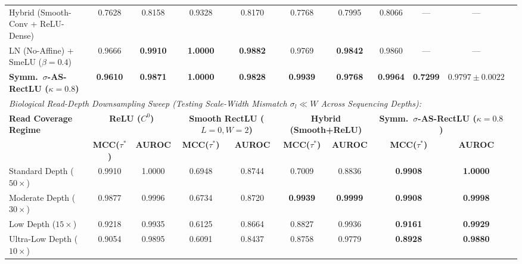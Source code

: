 \begin{table}[t]
\begin{tabular}{lcccccccccc}
Hybrid (Smooth-Conv + ReLU-Dense) & 0.7628 & 0.8158 & 0.9328 & 0.8170 & 0.7768 & 0.7995 & 0.8066 & --- & --- \\
LN (No-Affine) + SmeLU ($\beta=0.4$) & 0.9666 & \textbf{0.9910} & \textbf{1.0000} & \textbf{0.9882} & 0.9769 & \textbf{0.9842} & 0.9860 & --- & --- \\
\textbf{Symm.\ $\sigma$-AS-RectLU ($\kappa=0.8$)} & \textbf{0.9610} & \textbf{0.9871} & \textbf{1.0000} & \textbf{0.9828} & \textbf{0.9939} & \textbf{0.9768} & \textbf{0.9964} & \textbf{0.7299} & $\mathbf{0.9797 \pm 0.0022}$ \\
\midrule
\multicolumn{10}{l}{\textit{Biological Read-Depth Downsampling Sweep (Testing Scale-Width Mismatch $\sigma_l \ll W$ Across Sequencing Depths):}} \\
\midrule
\textbf{Read Coverage Regime} & \multicolumn{2}{c}{\textbf{ReLU ($C^0$)}} & \multicolumn{2}{c}{\textbf{Smooth RectLU ($L=0, W=2$)}} & \multicolumn{2}{c}{\textbf{Hybrid (Smooth+ReLU)}} & \multicolumn{3}{c}{\textbf{Symm.\ $\sigma$-AS-RectLU ($\kappa=0.8$)}} \\
\cmidrule(lr){2-3} \cmidrule(lr){4-5} \cmidrule(lr){6-7} \cmidrule(lr){8-10}
& \textbf{MCC($\tau^*$)} & \textbf{AUROC} & \textbf{MCC($\tau^*$)} & \textbf{AUROC} & \textbf{MCC($\tau^*$)} & \textbf{AUROC} & \multicolumn{2}{c}{\textbf{MCC($\tau^*$)}} & \textbf{AUROC} \\
\midrule
Standard Depth ($50\times$) & 0.9910 & 1.0000 & 0.6948 & 0.8744 & 0.7009 & 0.8836 & \multicolumn{2}{c}{\textbf{0.9908}} & \textbf{1.0000} \\
Moderate Depth ($30\times$) & 0.9877 & 0.9996 & 0.6734 & 0.8720 & \textbf{0.9939} & \textbf{0.9999} & \multicolumn{2}{c}{\textbf{0.9908}} & \textbf{0.9998} \\
Low Depth ($15\times$) & 0.9218 & 0.9935 & 0.6125 & 0.8664 & 0.8827 & 0.9936 & \multicolumn{2}{c}{\textbf{0.9161}} & \textbf{0.9929} \\
Ultra-Low Depth ($10\times$) & 0.9054 & 0.9895 & 0.6091 & 0.8437 & 0.8758 & 0.9779 & \multicolumn{2}{c}{\textbf{0.8928}} & \textbf{0.9880} \\
\bottomrule
\end{tabular}
\end{table}